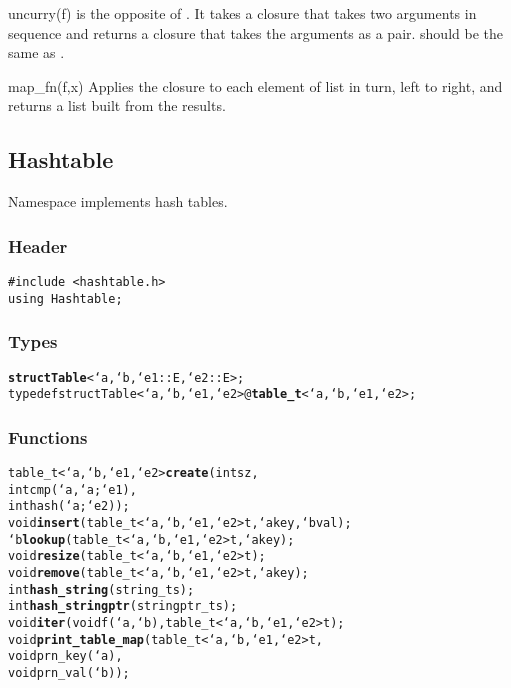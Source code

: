 \begin{defun}{uncurry}{(f)}
 is the opposite of .  It takes a closure that
takes two arguments in sequence and returns a closure that takes the
arguments as a pair.  
should be the same as .
\end{defun}

\begin{defun}{map_fn}{(f,x)}
Applies the closure  to each element of list  in turn,
left to right, and returns a list built from the results.
\end{defun}

\subsection{Hashtable}

Namespace  implements hash tables.

\subsubsection*{Header}
\begin{verbatim}
#include <hashtable.h>
using Hashtable;
\end{verbatim}

\subsubsection*{Types}
\begin{alltt}
\textbf{struct Table}<`a,`b,`e1::E,`e2::E>;
typedef struct Table<`a,`b,`e1,`e2> @\textbf{table_t}<`a,`b,`e1,`e2>;
\end{alltt}

\subsubsection*{Functions}

\begin{alltt}
table_t<`a,`b,`e1,`e2> \textbf{create}(int sz,
                              int cmp(`a,`a;`e1),
                              int hash(`a;`e2));
void                   \textbf{insert}(table_t<`a,`b,`e1,`e2> t, `a key, `b val);
`b                     \textbf{lookup}(table_t<`a,`b,`e1,`e2> t, `a key);
void                   \textbf{resize}(table_t<`a,`b,`e1,`e2> t);
void                   \textbf{remove}(table_t<`a,`b,`e1,`e2> t, `a key);
int                    \textbf{hash_string}(string_t s);
int                    \textbf{hash_stringptr}(stringptr_t s);
void                   \textbf{iter}(void f(`a,`b), table_t<`a,`b,`e1,`e2> t);
void                   \textbf{print_table_map}(table_t<`a,`b,`e1,`e2> t,
                                       void prn_key(`a), 
                                       void prn_val(`b));
\end{alltt}

